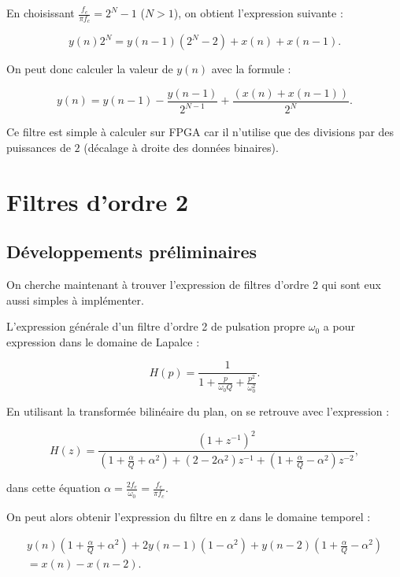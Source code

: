 \documentclass{article}
\begin{document}
En choisissant $\frac{f_e}{\pi f_c}=2^{N}-1$ ($N>1$), on obtient l'expression suivante :

\begin{equation}
y(n)2^N=y(n-1)(2^N-2)+x(n)+x(n-1).
\end{equation}

On peut donc calculer la valeur de $y(n)$ avec la formule :

\begin{equation}
y(n)=y(n-1)-\frac{y(n-1)}{2^{N-1}}+\frac{(x(n)+x(n-1))}{2^N}.
\end{equation}

Ce filtre est simple à calculer sur FPGA car il n'utilise que des divisions par des puissances de $2$ (décalage à droite des données binaires).

\section{Filtres d'ordre 2}

\subsection{Développements préliminaires}

On cherche maintenant à trouver l'expression de filtres d'ordre 2 qui sont eux aussi simples à implémenter.

L'expression générale d'un filtre d'ordre 2 de pulsation propre $\omega_0$ a pour expression dans le domaine de Lapalce :

\begin{equation}
H(p) = \frac{1}{1+\frac{p}{\omega_0 Q}+\frac{p^2}{\omega_0^2}}.
\end{equation}

En utilisant la transformée bilinéaire du plan, on se retrouve avec l'expression :

\begin{equation}
H(z) = \frac{(1+z^{-1})^2}{\left(1+\frac{\alpha}{Q}+\alpha^2 \right)+\left(2-2\alpha^2 \right)z^{-1}+\left(1+\frac{\alpha}{Q}-\alpha^2 \right)z^{-2}},
\end{equation}

dans cette équation $\alpha=\frac{2f_e}{\omega_0}=\frac{f_e}{\pi f_c}$.

On peut alors obtenir l'expression du filtre en z dans le domaine temporel :

\begin{multline}
y(n)\left(1+\frac{\alpha}{Q}+\alpha^2 \right)+2y(n-1)\left(1-\alpha^2 \right)+y(n-2)\left(1+\frac{\alpha}{Q}-\alpha^2 \right) \\
 = x(n)-x(n-2).
\end{multline}
\end{document}
